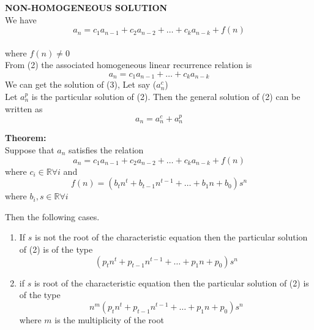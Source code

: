 \documentclass[11pt,letterpaper]{article}
\newenvironment{mytheorem}                    
        {\begin{mdframed}\textbf{Theorem:} \\}
        {\end{mdframed}}
\begin{document}
\textbf{NON-HOMOGENEOUS SOLUTION}\\
We have
\begin{equation}
  a_n = c_1 a_{n-1} + c_2 a_{n-2} + \dots + c_k a_{n-k} + f(n)
\end{equation}
\\
where $f(n) \neq 0$\\ 
From (2) the associated homogeneous linear recurrence relation is
\begin{equation}
  a_n = c_1 a_{n-1} + \dots + c_k a_{n-k} 
\end{equation}
We can get the solution of (3), Let say ($a_n^c$)\\
Let $a_n^p$ is the particular solution of (2). Then the general solution of (2) can be written as 
\[
  a_n = a_n^c + a_n^p
\]

\begin{mytheorem}
  Suppose that $a_n$ satisfies the relation 
  \[
    a_n = c_1 a_{n-1} + c_2a_{n-2} + \dots + c_k a_{n-k} + f(n)
  \]
  where $c_i \in \mathbb{R} \forall i$ and 
  \[
    f(n) = (b_tn^t + b_{t-1}n^{t-1} + \dots + b_1n+b_0) s^n 
  \]
  where $b_i, s \in \mathbb{R} \forall i$

  Then the following cases.
  \begin{enumerate}
    \item If $s$ is not the root of the characteristic equation then the particular solution of (2) is of the type
      \[
        (p_tn^t + p_{t-1}n^{t-1} + \dots + p_1n + p_0 ) s^n
      \]
    \item if $s$ is root of the characteristic equation then the particular solution of (2) is of the type 
      \[
        n^m(p_tn^t + p_{t-1}n^{t-1} + \dots + p_1n + p_0 ) s^n
      \]
      where $m$ is the multiplicity of the root
  \end{enumerate}
\end{mytheorem}
\end{document}
